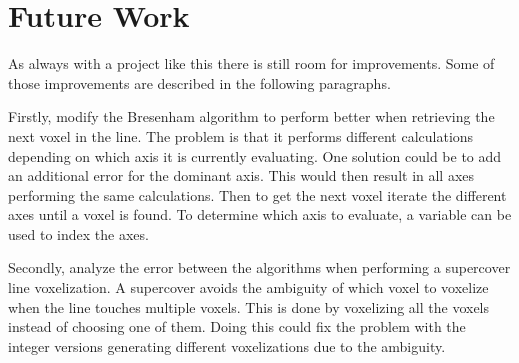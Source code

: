 \section{Future Work}
As always with a project like this there is still room for improvements.
Some of those improvements are described in the following paragraphs.

Firstly, modify the Bresenham algorithm to perform better when retrieving the next voxel in the line.
The problem is that it performs different calculations depending on which axis it is currently evaluating.
One solution could be to add an additional error for the dominant axis.
This would then result in all axes performing the same calculations.
Then to get the next voxel iterate the different axes until a voxel is found.
To determine which axis to evaluate, a variable can be used to index the axes.

Secondly, analyze the error between the algorithms when performing a supercover line voxelization.
A supercover avoids the ambiguity of which voxel to voxelize when the line touches multiple voxels.
This is done by voxelizing all the voxels instead of choosing one of them.
Doing this could fix the problem with the integer versions generating different voxelizations due to the ambiguity.

